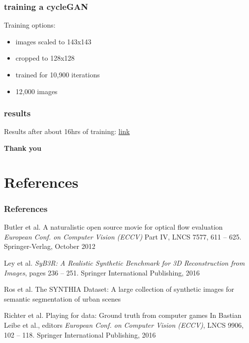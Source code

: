 \documentclass{beamer}
\begin{document}
\begin{frame}
	\frametitle{training a cycleGAN}
	Training options:
	\begin{itemize}
		\item images scaled to 143x143
		\item cropped to 128x128
		\item trained for 10,900 iterations
		\item 12,000 images
	\end{itemize}
\end{frame}

\begin{frame}
\frametitle{results}
Results after about 16hrs of training:
\href{file:///media/peete/My\%20Passport/thesis/cycleGAN_results/experiment_name/test_latest/index.html}{link}
\end{frame}

\begin{frame}
	\begin{center}
		\textbf{Thank you}
	\end{center}
\end{frame}

\section{References}

\begin{frame}
\frametitle{References}
\footnotesize{
\begin{thebibliography}{99} 
	 Butler et al.
	\newblock A naturalistic open source movie for optical flow evaluation
	\newblock \emph{European Conf. on Computer Vision (ECCV)} Part IV, LNCS 7577, 611 -- 625. Springer-Verlag, October 2012
\end{thebibliography}

\begin{thebibliography}{99} 
	 Ley et al.
	\newblock
	\newblock \emph{SyB3R: A Realistic Synthetic Benchmark for 3D Reconstruction from Images}, pages 236 -- 251. Springer International Publishing, 2016
\end{thebibliography}

\begin{thebibliography}{99} 
	 Ros et al.
	\newblock The SYNTHIA Dataset: A large collection of synthetic images for semantic segmentation of urban scenes
\end{thebibliography}

\begin{thebibliography}{99} 
	 Richter et al.
	\newblock Playing for data: Ground truth from computer games
	\newblock In Bastian Leibe et al., editors \emph{European Conf. on Computer Vision (ECCV)}, LNCS 9906, 102 -- 118. Springer International Publishing, 2016
\end{thebibliography}
}
\end{frame}
\end{document}
